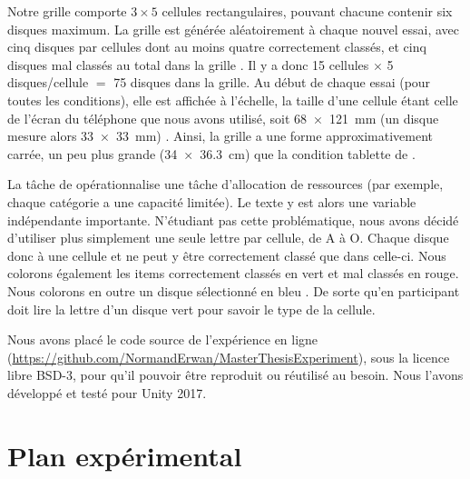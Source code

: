 Notre grille comporte $3 \times 5$ cellules rectangulaires, pouvant chacune contenir six disques maximum. La grille est générée aléatoirement à chaque nouvel essai, avec cinq disques par cellules dont au moins quatre correctement classés, et cinq disques mal classés au total dans la grille . Il y a donc 15 cellules $\times$ 5 disques/cellule $=$ 75 disques dans la grille. Au début de chaque essai (pour toutes les conditions), elle est affichée à l'échelle, la taille d'une cellule étant celle de l'écran du téléphone que nous avons utilisé, soit \SI{68x121}{\mm} (un disque mesure alors \SI{33x33}{\mm}) . Ainsi, la grille a une forme approximativement carrée, un peu plus grande (\SI{34x36.3}{\cm}) que la condition tablette de \cite{Raedle2014}.


La tâche de \cite{Liu2014} opérationnalise une tâche d'allocation de ressources (par exemple, chaque catégorie a une capacité limitée). Le texte y est alors une variable indépendante importante. N'étudiant pas cette problématique, nous avons décidé d'utiliser plus simplement une seule lettre par cellule, de A à O. Chaque disque  donc à une cellule et ne peut y être correctement classé que dans celle-ci. Nous colorons également les items correctement classés en vert et mal classés en rouge. Nous colorons en outre un disque sélectionné en bleu . De sorte qu'en participant doit lire la lettre d'un disque vert pour savoir le type de la cellule.

Nous avons placé le code source de l'expérience en ligne (\url{https://github.com/NormandErwan/MasterThesisExperiment}), sous la licence libre BSD-3, pour qu'il pouvoir être reproduit ou réutilisé au besoin. Nous l'avons développé et testé pour Unity 2017.


\section{Plan expérimental}
\label{sec:experiment_design}


